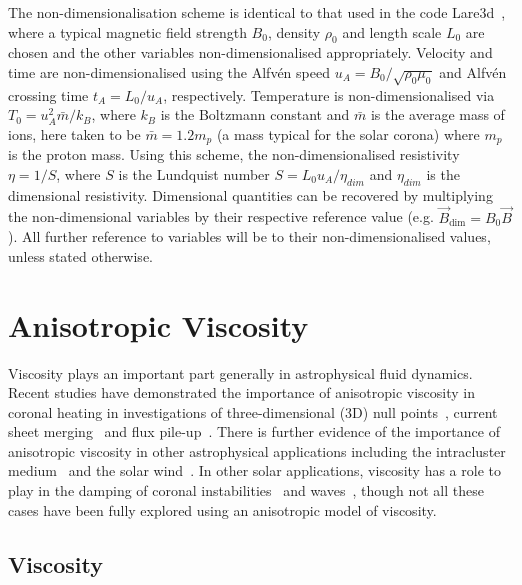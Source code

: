 The non-dimensionalisation scheme is identical to that used in the code Lare3d~\cite{arberStaggeredGridLagrangian2001}, where a typical magnetic field strength $B_0$, density $\rho_0$ and length scale $L_0$ are chosen and the other variables non-dimensionalised appropriately. Velocity and time are
non-dimensionalised using the Alfv\'en speed $u_A = B_0 / \sqrt{\rho_0
  \mu_0}$ and Alfv\'en crossing time $t_A = L_0/u_A$,
respectively. Temperature is non-dimensionalised via $T_0 = u_A^2
\bar{m} / k_B$, where $k_B$ is the Boltzmann constant and $\bar{m}$ is
the average mass of ions, here taken to be $\bar{m} = 1.2m_p$ (a mass
typical for the solar corona) where $m_p$ is the proton mass. Using this scheme, the non-dimensionalised resistivity $\eta = 1/S$, where $S$ is the Lundquist number $S=L_0 u_A /\eta_{dim}$ and $\eta_{dim}$ is the dimensional resistivity. Dimensional quantities can be recovered by multiplying the non-dimensional variables by their respective reference value (e.g. $\vec{B}_{\dim} = B_0 \vec{B}$). All further reference to variables will be to their non-dimensionalised values, unless stated otherwise.

\section{Anisotropic Viscosity}

Viscosity plays an important part generally in astrophysical fluid dynamics. Recent studies have demonstrated the importance of anisotropic viscosity in coronal heating in investigations of three-dimensional (3D) null points~\cite{craigViscousDissipation3D2013}, current sheet merging~\cite{armstrongViscoResistiveDissipation2013} and flux pile-up~\cite{litvinenkoViscousEnergyDissipation2005}. There is further evidence of the importance of anisotropic viscosity in other astrophysical applications including the intracluster medium~\cite{zuhoneEffectAnisotropicViscosity2014, parrishEffectsAnisotropicViscosity2012a} and the solar wind~\cite{baleMagneticFluctuationPower2009}. In other solar applications, viscosity has a role to play in the damping of coronal instabilities~\cite{howsonEffectsResistivityViscosity2017} and waves~\cite{vranjesViscosityEffectsWaves2014, erdelyiResonantAbsorptionAlfven1995a, rudermanSlowSurfaceWave2000a}, though not all these cases have been fully explored using an anisotropic model of viscosity.

\subsection{Viscosity}

